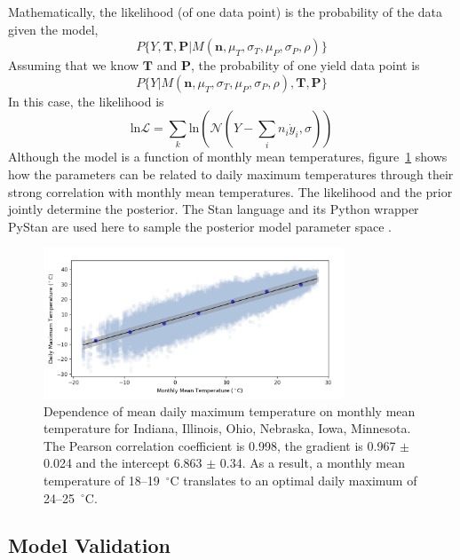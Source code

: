 \documentclass[12pt]{article}
\begin{document}
Mathematically, the likelihood (of one data point) is the probability of the data given the model,
\begin{equation}
P\{ Y, \mathbf{T}, \mathbf{P} | M\left(\mathbf{n}, \mu_T, \sigma_{T}, \mu_P,\sigma_{P},\rho\right) \}
\end{equation}
Assuming that we know $\mathbf{T}$ and $\mathbf{P}$, the probability of one yield data point is 
\begin{equation}
P\{ Y | M(\mathbf{n}, \mu_T, \sigma_{T}, \mu_P,\sigma_{P},\rho),  \mathbf{T}, \mathbf{P} \}
\end{equation}
In this case, the likelihood is 
\begin{equation}
\textrm{ln} \mathcal{L} = \sum_k \textrm{ln} \left( \mathcal{N}(Y - \sum_i n_i \dot{y}_i, \sigma ) \right)
\end{equation}
Although the model is a function of monthly mean temperatures, figure~\ref{fig:daily_vs_monthly} shows how the parameters can be related to daily maximum temperatures through their strong correlation with monthly mean temperatures. The likelihood and the prior jointly determine the posterior. The Stan language and its Python wrapper PyStan are used here to sample the posterior model parameter space \citep{carpenter:2017}.

\begin{figure}
\centering
\includegraphics[width=0.8\textwidth]{./figures/daily_max_vs_monthly_mean_temp2.png}
\caption{\label{fig:daily_vs_monthly} Dependence of mean daily maximum temperature on monthly mean temperature for Indiana, Illinois, Ohio, Nebraska, Iowa, Minnesota. The Pearson correlation coefficient is 0.998, the gradient is 0.967 $\pm$ 0.024 and the intercept 6.863 $\pm$ 0.34. As a result, a monthly mean temperature of 18--19~$^\circ$C translates to an optimal daily maximum of 24--25~$^\circ$C. }
\end{figure}


\subsection{Model Validation}
\label{sec:validation}
\end{document}
